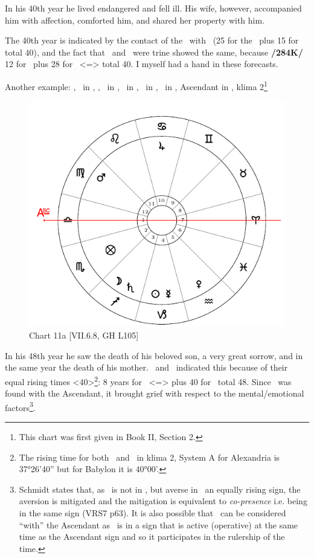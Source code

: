 In his 40th year he lived endangered and fell ill. His wife, however, accompanied him with affection, comforted him, and shared her property with him. 

The 40th year is indicated by the contact of the \Moon\, with \Mars\, (25 for the \Moon\, plus 15 for \Mars\, total 40), and the fact that \Jupiter\, and \Venus\, were trine showed the same, because \textbf{/284K/} 12 for \Jupiter\, plus 28 for \Venus\, <=\Capricorn> total 40. I myself had a hand in these forecasts.

\newpage
Another example: \Sun, \Mercury\, in \Capricorn, \Moon, \Saturn\, in \Sagittarius, \Jupiter\, in \Cancer, \Mars\, in \Virgo, \Venus\, in \Aquarius, Ascendant in \Libra, klima 2\footnote{This chart was first given in Book II, Section 2.}

\begin{figure}
\centering
\vspace{0pt}
\includegraphics[width=.68\textwidth]{charts/7_6_08}
\caption{Chart 11a [VII.6.8, GH L105] }
\label{fig:chart11a}
\end{figure} 

In his 48th year he saw the death of his beloved son, a very great sorrow, and in the same year the death of his mother. \Virgo\, and \Libra\, indicated this because of their equal rising times <40>\footnote{The rising time for both \Virgo\, and \Libra\, in klima 2, System A for Alexandria is 37°26'40'' but for Babylon it is 40°00'.}: 8 years for \Libra\, <=\Venus> plus 40 for \Virgo\, total 48. Since \Mars\, was found with the Ascendant, it brought grief with respect to the mental/emotional factors\footnote{Schmidt states that, as \Mars\, is not in \Libra, but averse in \Virgo\, an equally rising sign, the aversion is mitigated and the mitigation is equivalent to \textsl{co-presence} i.e. being in the same sign (VRS7 p63). It is also possible that \Mars\, can be considered ``with'' the Ascendant as \Mars\, is in a sign that is active (operative) at the same time as the Ascendant sign and so it participates in the rulership of the time.}. 

